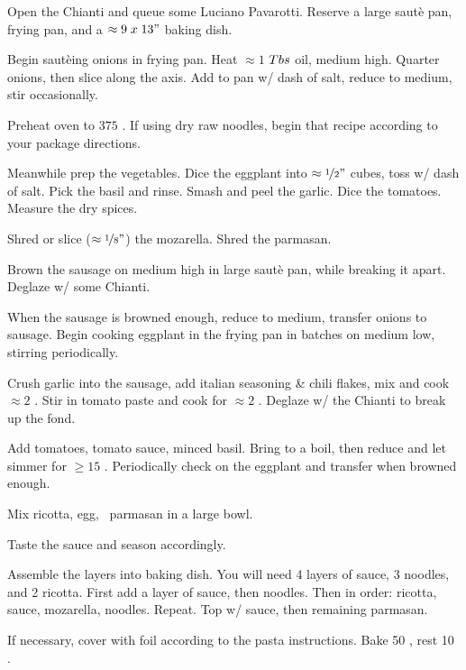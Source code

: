 

\begin{preparation}
\item Open the Chianti and queue some Luciano Pavarotti.
	Reserve a large saut\`{e} pan, frying pan, and a $\approx 9\; x\; 13"$ baking dish.

\item Begin saut\`{e}ing onions in frying pan.
	Heat $\approx 1$ $Tbs$ oil, medium high.
	Quarter onions, then slice along the axis.
	Add to pan w/ dash of salt, reduce to medium, stir occasionally.

\item Preheat oven to $375$ \Fahrenheit.
	If using dry raw noodles, begin that recipe according to your package directions.

\item Meanwhile prep the vegetables.
	Dice the eggplant into $\approx \nicefrac{1}{2} "$ cubes, toss w/ dash of salt.
	Pick the basil and rinse.
	Smash and peel the garlic.
	Dice the tomatoes.
	Measure the dry spices.

\item Shred or slice ($\approx \nicefrac{1}{8} "$) the mozarella.
	Shred the parmasan.

\item Brown the sausage on medium high in large saut\`{e} pan, while breaking it apart.
	Deglaze w/ some Chianti.

\item When the sausage is browned enough, reduce to medium, transfer onions to sausage.
	Begin cooking eggplant in the frying pan in batches on medium low, stirring periodically.

\item Crush garlic into the sausage, add italian seasoning \& chili flakes, mix and cook $\approx 2$ \minute.
	Stir in tomato paste and cook for $\approx 2$ \minute.
	Deglaze w/ the Chianti to break up the fond.

\item Add tomatoes, tomato sauce, minced basil.
	Bring to a boil, then reduce and let simmer for $\geq 15$ \minute.
	Periodically check on the eggplant and transfer when browned enough.

\item Mix ricotta, egg, \onehalf~parmasan in a large bowl.

\item Taste the sauce and season accordingly.

\item Assemble the layers into baking dish.
	You will need 4 layers of sauce, 3 noodles, and 2 ricotta.
	First add a layer of sauce, then noodles.
	Then in order: ricotta, sauce, mozarella, noodles.
	Repeat.
	Top w/ sauce, then remaining parmasan.

\item If necessary, cover with foil according to the pasta instructions.
	Bake 50 \minute, rest 10 \minute.
\end{preparation}


